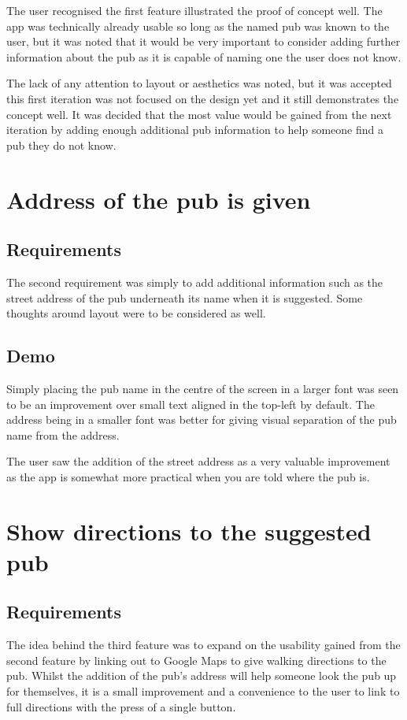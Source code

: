 \documentclass{report}
\begin{document}
The user recognised the first feature illustrated the proof of concept
well. The app was technically already usable so long as the named pub
was known to the user, but it was noted that it would be very important
to consider adding further information about the pub as it is capable
of naming one the user does not know.

The lack of any attention to layout or aesthetics was noted, but it was
accepted this first iteration was not focused on the design yet and it
still demonstrates the concept well. It was decided that the most
value would be gained from the next iteration by adding enough
additional pub information to help someone find a pub they do not know.

\section{ Address of the pub is given}
\subsection{Requirements}

The second requirement was simply to add additional information such as
the street address of the pub underneath its name when it is suggested.
Some thoughts around layout were to be considered as well.

\subsection{Demo}

Simply placing the pub name in the centre of the screen in a larger font
was seen to be an improvement over small text aligned in the top-left
by default. The address being in a smaller font was better for giving
visual separation of the pub name from the address.

The user saw the addition of the street address as a very valuable improvement
as the app is somewhat more practical when you are told where the pub is.

\section{Show directions to the suggested pub}
\subsection{Requirements}

The idea behind the third feature was to expand on the usability gained
from the second feature by linking out to Google Maps to give walking
directions to the pub. Whilst the addition of the pub's address will
help someone look the pub up for themselves, it is a small improvement
and a convenience to the user to link to full directions with the press
of a single button.
\end{document}

